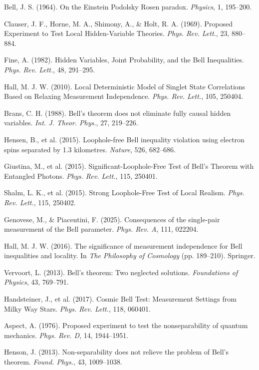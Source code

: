 \documentclass[twocolumn,aps,pre,floatfix,nofootinbib]{revtex4-2}
\begin{document}

\begin{thebibliography}{99}

Bell, J. S. (1964).
On the Einstein Podolsky Rosen paradox.
\textit{Physics}, 1, 195–200.

Clauser, J. F., Horne, M. A., Shimony, A., \& Holt, R. A. (1969).
Proposed Experiment to Test Local Hidden-Variable Theories.
\textit{Phys. Rev. Lett.}, 23, 880–884.

Fine, A. (1982).
Hidden Variables, Joint Probability, and the Bell Inequalities.
\textit{Phys. Rev. Lett.}, 48, 291–295.

Hall, M. J. W. (2010).
Local Deterministic Model of Singlet State Correlations Based on Relaxing Measurement Independence.
\textit{Phys. Rev. Lett.}, 105, 250404.

Brans, C. H. (1988).
Bell's theorem does not eliminate fully causal hidden variables.
\textit{Int. J. Theor. Phys.}, 27, 219–226.

Hensen, B., et al. (2015).
Loophole-free Bell inequality violation using electron spins separated by 1.3 kilometres.
\textit{Nature}, 526, 682–686.

Giustina, M., et al. (2015).
Significant-Loophole-Free Test of Bell's Theorem with Entangled Photons.
\textit{Phys. Rev. Lett.}, 115, 250401.

Shalm, L. K., et al. (2015).
Strong Loophole-Free Test of Local Realism.
\textit{Phys. Rev. Lett.}, 115, 250402.

Genovese, M., \& Piacentini, F. (2025).
Consequences of the single-pair measurement of the Bell parameter.
\textit{Phys. Rev. A}, 111, 022204.

Hall, M. J. W. (2016).
The significance of measurement independence for Bell inequalities and locality.
In \textit{The Philosophy of Cosmology} (pp. 189–210).
Springer.

Vervoort, L. (2013).
Bell’s theorem: Two neglected solutions.
\textit{Foundations of Physics}, 43, 769–791.

Handsteiner, J., et al. (2017).
Cosmic Bell Test: Measurement Settings from Milky Way Stars.
\textit{Phys. Rev. Lett.}, 118, 060401.

Aspect, A. (1976).
Proposed experiment to test the nonseparability of quantum mechanics.
\textit{Phys. Rev. D}, 14, 1944–1951.

Henson, J. (2013).
Non-separability does not relieve the problem of Bell's theorem.
\textit{Found. Phys.}, 43, 1009–1038.

\end{thebibliography}
\end{document}
